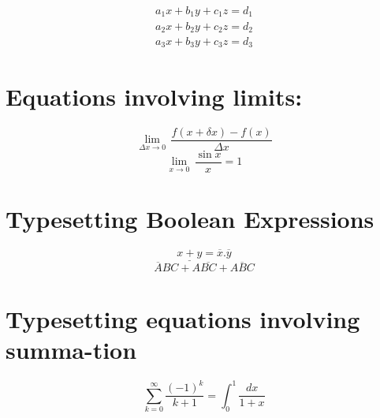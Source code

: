 \documentclass[12 pt,a4paper]{report}
\begin{document}
\begin{eqnarray}   %
a_{1}x+b_{1}y+c_{1}z=d_{1}\\
a_{2}x+b_{2}y+c_{2}z=d_{2}\\
a_{3}x+b_{3}y+c_{3}z=d_{3}
\end{eqnarray}
\section{Equations involving limits:}
$$\underset{\Delta x\rightarrow 0}{\lim}\,\frac{f(x+\delta x)-f(x)}{\Delta x}$$
$$\underset{x\rightarrow 0}{\lim}\,\frac{\sin x}{x}=1$$
\section{Typesetting Boolean Expressions}
$$\underline{x+y}=\overline{x}.\overline{y}$$
$$\overline{A}BC+A\overline{BC}+\overline{ABC}$$
\section{Typesetting equations involving summa-tion}
$$\sum_{k=0}^{\infty}\frac{(-1)^{k}}{k+1}=\int_{0}^{1}\frac{dx}{1+x}$$
\end{document}
